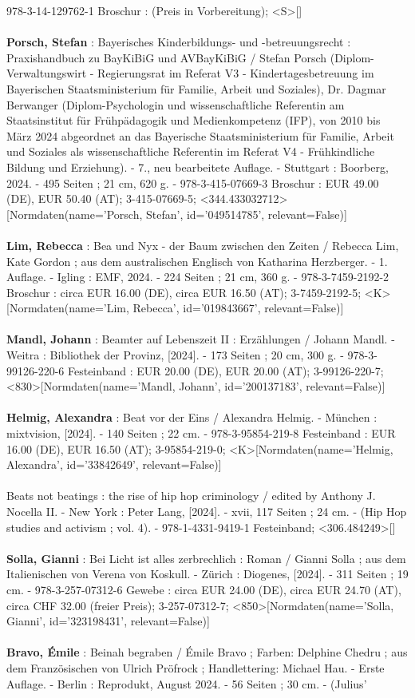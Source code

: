 \documentclass{article}
\begin{document}
\begin{multicols}{3}
978-3-14-129762-1 Broschur : (Preis in Vorbereitung); <S>[]\\\\\textbf{Porsch, Stefan} : Bayerisches Kinderbildungs- und -betreuungsrecht : Praxishandbuch zu BayKiBiG und AVBayKiBiG / Stefan Porsch (Diplom-Verwaltungswirt - Regierungsrat im Referat V3 - Kindertagesbetreuung im Bayerischen Staatsministerium für Familie, Arbeit und Soziales), Dr. Dagmar Berwanger (Diplom-Psychologin und wissenschaftliche Referentin am Staatsinstitut für Frühpädagogik und Medienkompetenz (IFP), von 2010 bis März 2024 abgeordnet an das Bayerische Staatsministerium für Familie, Arbeit und Soziales als wissenschaftliche Referentin im Referat V4 - Frühkindliche Bildung und Erziehung). - 7., neu bearbeitete Auflage. - Stuttgart : Boorberg, 2024. - 495 Seiten ; 21 cm, 620 g. - 978-3-415-07669-3 Broschur : EUR 49.00 (DE), EUR 50.40 (AT); 3-415-07669-5; <344.433032712>[Normdaten(name='Porsch, Stefan', id='049514785', relevant=False)]\\\\\textbf{Lim, Rebecca} : Bea und Nyx - der Baum zwischen den Zeiten / Rebecca Lim, Kate Gordon ; aus dem australischen Englisch von Katharina Herzberger. - 1. Auflage. - Igling : EMF, 2024. - 224 Seiten ; 21 cm, 360 g. - 978-3-7459-2192-2 Broschur : circa EUR 16.00 (DE), circa EUR 16.50 (AT); 3-7459-2192-5; <K>[Normdaten(name='Lim, Rebecca', id='019843667', relevant=False)]\\\\\textbf{Mandl, Johann} : Beamter auf Lebenszeit II : Erzählungen / Johann Mandl. - Weitra : Bibliothek der Provinz, [2024]. - 173 Seiten ; 20 cm, 300 g. - 978-3-99126-220-6 Festeinband : EUR 20.00 (DE), EUR 20.00 (AT); 3-99126-220-7; <830>[Normdaten(name='Mandl, Johann', id='200137183', relevant=False)]\\\\\textbf{Helmig, Alexandra} : Beat vor der Eins / Alexandra Helmig. - München : mixtvision, [2024]. - 140 Seiten ; 22 cm. - 978-3-95854-219-8 Festeinband : EUR 16.00 (DE), EUR 16.50 (AT); 3-95854-219-0; <K>[Normdaten(name='Helmig, Alexandra', id='33842649', relevant=False)]\\\\Beats not beatings : the rise of hip hop criminology / edited by Anthony J. Nocella II. - New York : Peter Lang, [2024]. - xvii, 117 Seiten ; 24 cm. - (Hip Hop studies and activism ; vol. 4). - 978-1-4331-9419-1 Festeinband; <306.484249>[]\\\\\textbf{Solla, Gianni} : Bei Licht ist alles zerbrechlich : Roman / Gianni Solla ; aus dem Italienischen von Verena von Koskull. - Zürich : Diogenes, [2024]. - 311 Seiten ; 19 cm. - 978-3-257-07312-6 Gewebe : circa EUR 24.00 (DE), circa EUR 24.70 (AT), circa CHF 32.00 (freier Preis); 3-257-07312-7; <850>[Normdaten(name='Solla, Gianni', id='323198431', relevant=False)]\\\\\textbf{Bravo, Émile} : Beinah begraben / Émile Bravo ; Farben: Delphine Chedru ; aus dem Französischen von Ulrich Pröfrock ; Handlettering: Michael Hau. - Erste Auflage. - Berlin : Reprodukt, August 2024. - 56 Seiten ; 30 cm. - (Julius' 
\end{multicols}
\end{document}
